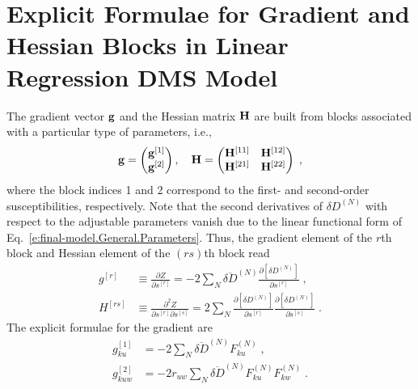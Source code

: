 \documentclass[aip,jcp,preprint,amsmath,amssymb,floatfix]{revtex4-1}
\begin{document}
\section{\label{a:blocks} Explicit Formulae for Gradient and Hessian Blocks in Linear Regression DMS Model}

The gradient vector ${\bf g}$ and the Hessian matrix ${\bf H}$ 
are built from blocks associated with a particular type of parameters, i.e.,
%
\begin{equation}\label{e:Newton.gH}
 {\bf g} = 
\begin{pmatrix}
{\bf g}^{[1]} \\ 
{\bf g}^{[2]} 
\end{pmatrix} ,\quad
 {\bf H} = 
\begin{pmatrix}
{\bf H}^{[11]} & {\bf H}^{[12]}  \\ 
{\bf H}^{[21]} & {\bf H}^{[22]}  
\end{pmatrix} \;,
\end{equation}
%
where the block indices 1 and 2 correspond to the first\hyp{} and second\hyp{}order susceptibilities, respectively.
Note that the second derivatives of $\delta D^{(N)}$ 
with respect to the adjustable parameters vanish
due to the linear functional form of Eq.~\eqref{e:final-model.General.Parameters}.
Thus, the gradient element of the $r$th block and Hessian element of the $(rs)$th block read
%
\begin{subequations}
 \begin{align}
  g^{[r ]}    &\equiv \frac{\partial   Z}{\partial s^{[r]}} 
     =-2\sum_N \overline{\delta D}^{(N)}
               \frac{\partial   \left[ \delta D^{(N)} \right]}{\partial s^{[r]}} \;,\\
  H^{[rs]} &\equiv \frac{\partial^2 Z}{\partial s^{[r]} \partial s^{[s]}}  
     = 2\sum_N 
        \frac{\partial   \left[ \delta D^{(N)} \right]}{\partial s^{[r]}}
        \frac{\partial   \left[ \delta D^{(N)} \right]}{\partial s^{[s]}} \;.
 \end{align}
\end{subequations}
%
The explicit formulae for the gradient are
%
\begin{subequations}
 \begin{align}
  g^{[1]}_{ku} &=-2\sum_N \overline{\delta D}^{(N)} F^{(N)}_{ku} \;,\\
  g^{[2]}_{kuw} &=-2r_{uw} \sum_N \overline{\delta D}^{(N)} F^{(N)}_{ku} F^{(N)}_{kw} \;.
 \end{align}
\end{subequations}
%
\end{document}

